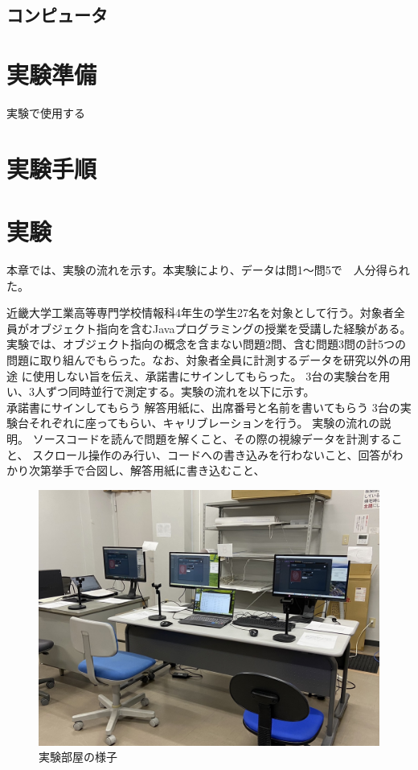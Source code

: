 \documentclass[paper=a4paper,fontsize=10pt]{jlreq}
\begin{document}
    \subsection{コンピュータ}
      
  
  \section{実験準備}
    実験で使用する
  
  \section{実験手順}


  \section{実験}
    本章では、実験の流れを示す。本実験により、データは問1～問5で　人分得られた。

    近畿大学工業高等専門学校情報科4年生の学生27名を対象として行う。対象者全員がオブジェクト指向を含むJavaプログラミングの授業を受講した経験がある。\\
    実験では、オブジェクト指向の概念を含まない問題2問、含む問題3問の計5つの問題に取り組んでもらった。なお、対象者全員に計測するデータを研究以外の用途
    に使用しない旨を伝え、承諾書にサインしてもらった。
    3台の実験台を用い、3人ずつ同時並行で測定する。実験の流れを以下に示す。\\
    
    承諾書にサインしてもらう
    解答用紙に、出席番号と名前を書いてもらう
    3台の実験台それぞれに座ってもらい、キャリブレーションを行う。
    実験の流れの説明。
    ソースコードを読んで問題を解くこと、その際の視線データを計測すること、
    スクロール操作のみ行い、コードへの書き込みを行わないこと、回答がわかり次第挙手で合図し、解答用紙に書き込むこと、


    \begin{figure}[htbp]
      \centering
      \includegraphics[width=0.8\linewidth]{実験部屋.jpg}
      \caption{実験部屋の様子}
    \end{figure}
    \FloatBarrier
\end{document}
